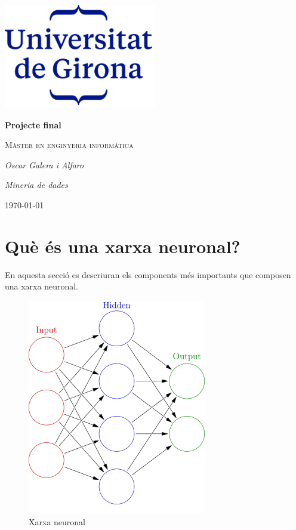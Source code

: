 \documentclass[12pt]{article}
\begin{document}
\begin{titlepage}
		\centering
		\includegraphics[width=0.5\textwidth]{imatges/logo.png}\par\vspace{1cm}
		{\huge\bfseries Projecte final\par}
		\vspace{1cm}
		{\scshape\Large Màster en enginyeria informàtica\par}
		\vspace{1.5cm}
		{\Large\itshape Oscar Galera i Alfaro\par}
		\vspace{1cm}
		{\Large\itshape Mineria de dades\par}
		\vspace{2cm}
		\vfill
		\vfill
		{\large \today\par}
\end{titlepage}
\clearpage
\tableofcontents
\clearpage
\listoffigures


\clearpage
\section{Què és una xarxa neuronal?}
En aquesta secció es descriuran els components més importants que composen una xarxa neuronal.
\begin{figure}[h!]
	\centering
	\includegraphics[scale=.5]{imatges/xnn.png}
	\caption{Xarxa neuronal}
\end{figure}
\end{document}
